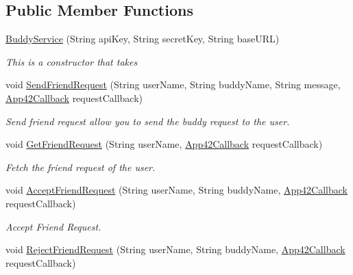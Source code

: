 \subsection*{Public Member Functions}
\begin{DoxyCompactItemize}
\item 
\hyperlink{classcom_1_1shephertz_1_1app42_1_1paas_1_1sdk_1_1windows_1_1buddy_1_1_buddy_service_a3fed79588d9e5286374974f69e9ca4ab}{Buddy\+Service} (String api\+Key, String secret\+Key, String base\+U\+R\+L)
\begin{DoxyCompactList}\small\item\em This is a constructor that takes \end{DoxyCompactList}\item 
void \hyperlink{classcom_1_1shephertz_1_1app42_1_1paas_1_1sdk_1_1windows_1_1buddy_1_1_buddy_service_a53b8835b37c19cb1e5d02019bc54d4ed}{Send\+Friend\+Request} (String user\+Name, String buddy\+Name, String message, \hyperlink{interfacecom_1_1shephertz_1_1app42_1_1paas_1_1sdk_1_1windows_1_1_app42_callback}{App42\+Callback} request\+Callback)
\begin{DoxyCompactList}\small\item\em Send friend request allow you to send the buddy request to the user. \end{DoxyCompactList}\item 
void \hyperlink{classcom_1_1shephertz_1_1app42_1_1paas_1_1sdk_1_1windows_1_1buddy_1_1_buddy_service_a782bbd79a4d8296aa7d3bc6d7f621202}{Get\+Friend\+Request} (String user\+Name, \hyperlink{interfacecom_1_1shephertz_1_1app42_1_1paas_1_1sdk_1_1windows_1_1_app42_callback}{App42\+Callback} request\+Callback)
\begin{DoxyCompactList}\small\item\em Fetch the friend request of the user. \end{DoxyCompactList}\item 
void \hyperlink{classcom_1_1shephertz_1_1app42_1_1paas_1_1sdk_1_1windows_1_1buddy_1_1_buddy_service_ac7d71474904331e6a75d928e2403b773}{Accept\+Friend\+Request} (String user\+Name, String buddy\+Name, \hyperlink{interfacecom_1_1shephertz_1_1app42_1_1paas_1_1sdk_1_1windows_1_1_app42_callback}{App42\+Callback} request\+Callback)
\begin{DoxyCompactList}\small\item\em Accept Friend Request. \end{DoxyCompactList}\item 
void \hyperlink{classcom_1_1shephertz_1_1app42_1_1paas_1_1sdk_1_1windows_1_1buddy_1_1_buddy_service_af8b2ea5cd9b66beeec551325e28f6070}{Reject\+Friend\+Request} (String user\+Name, String buddy\+Name, \hyperlink{interfacecom_1_1shephertz_1_1app42_1_1paas_1_1sdk_1_1windows_1_1_app42_callback}{App42\+Callback} request\+Callback)

\end{DoxyCompactItemize}

